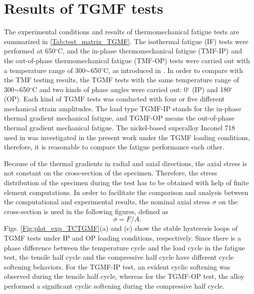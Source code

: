 \documentclass[preprint,5p,twocolumn,10pt,sort&compress]{elsarticle}
\begin{document}
\section{Results of TGMF tests}

The experimental conditions and results of thermomechanical fatigue tests are summarized in \autoref{Tab:test_matrix_TGMF}. The isothermal fatigue (IF) tests were performed at 650$^\circ$C, and the in-phase thermomechanical fatigue (TMF-IP) and the out-of-phase thermomechanical fatigue (TMF-OP) tests were carried out with a temperature range of 300$\sim$650$^\circ$C, as introduced in \cite{SUN2019228, SUN201989}. In order to compare with the TMF testing results, the TGMF tests with the same temperature range of 300$\sim$650$^\circ$C and two kinds of phase angles were carried out: 0$^\circ$ (IP) and 180$^\circ$ (OP). Each kind of TGMF tests was conducted with four or five different mechanical strain amplitudes. The load type TGMF-IP stands for the in-phase thermal gradient mechanical fatigue, and TGMF-OP means the out-of-phase thermal gradient mechanical fatigue. The nickel-based superalloy Inconel 718 used in \cite{SUN2019228, SUN201989} was investigated in the present work under the TGMF loading conditions, therefore, it is reasonable to compare the fatigue performance each other.

Because of the thermal gradients in radial and axial directions, the axial stress is not constant on the cross-section of the specimen.
Therefore, the stress distribution of the specimen during the test has to be obtained with help of finite element  computations.
In order to facilitate the comparison and analysis between the computational and experimental results, the nominal axial stress $\sigma$ on the cross-section is used in the following figures, defined as
\begin{equation}
\sigma = F/A.
\end{equation}
Figs. \ref{Fig:plot_exp_TCTGMF}(a) and (c) show the stable hysteresis loops of TGMF tests under IP and OP loading conditions, respectively.
Since there is a phase difference between the temperature cycle and the load cycle in the fatigue test, the tensile half cycle and the compressive half cycle have different cycle softening behaviors.
For the TGMF-IP test, an evident cyclic softening was observed during the tensile half cycle, whereas for the TGMF-OP test, the alloy performed a significant cyclic softening during the compressive half cycle.
\end{document}
